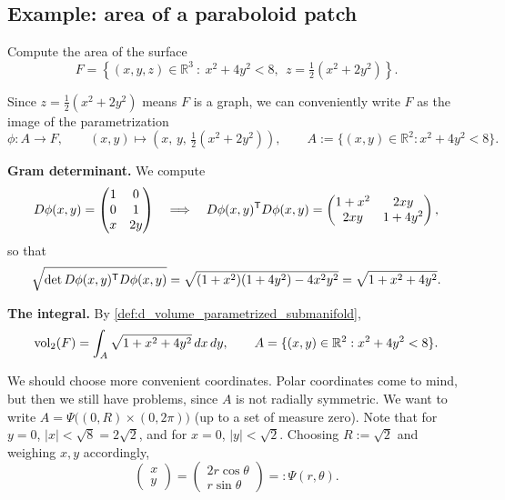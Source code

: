 \subsection{Example: area of a paraboloid patch}
\label{sec:example_paraboloid_area}

\begin{example}
\label{ex:paraboloid_patch_area}
Compute the area of the surface
\[F = \left\{(x,y,z)\in\mathbb{R}^3 \ :\ x^2+4y^2 < 8,\ \ z = \tfrac12(x^2+2y^2)\right\}.\]

Since $z = \tfrac12(x^2+2y^2)$ means $F$ is a graph, we can conveniently write $F$ as the
image of the parametrization
\[\phi : A \to F, \qquad (x,y) \mapsto \left(x,\,y,\,\tfrac12(x^2+2y^2)\right),
  \qquad A := \{(x,y)\in\mathbb{R}^2 : x^2+4y^2 < 8\}.\]

\textbf{Gram determinant.} We compute
\[D\phi(x,y) = \begin{pmatrix} 1 & 0 \\ 0 & 1 \\ x & 2y \end{pmatrix}
  \quad \Longrightarrow \quad
  D\phi(x,y)^{\mathsf{T}} D\phi(x,y) = \begin{pmatrix} 1+x^2 & 2xy \\ 2xy & 1+4y^2 \end{pmatrix},\]
so that
\[\sqrt{\det D\phi(x,y)^{\mathsf{T}} D\phi(x,y)}
  = \sqrt{(1+x^2)(1+4y^2) - 4x^2y^2}
  = \sqrt{1+x^2+4y^2}.\]

\textbf{The integral.} By \cref{def:d_volume_parametrized_submanifold},
\[\operatorname{vol}_2(F) = \int_A \sqrt{1+x^2+4y^2}\,dx\,dy, \qquad A = \{(x,y)\in\mathbb{R}^2 :
x^2+4y^2<8\}.\]

We should choose more convenient coordinates. Polar coordinates come to mind, but then we
still have problems, since $A$ is not radially symmetric. We want to write
$A = \Psi\big((0,R)\times(0,2\pi)\big)$ (up to a set of measure zero). Note that for $y=0$,
$|x| < \sqrt8 = 2\sqrt2$, and for $x=0$, $|y| < \sqrt2$. Choosing $R := \sqrt2$ and weighing
$x,y$ accordingly,
\[\begin{pmatrix} x \\ y \end{pmatrix} = \begin{pmatrix} 2r\cos\theta \\ r\sin\theta
\end{pmatrix} =: \Psi(r,\theta).\]


\end{example}
